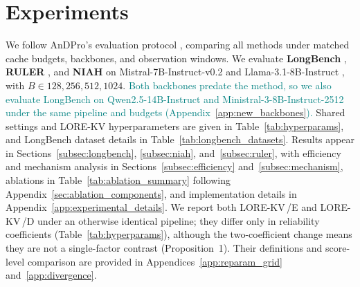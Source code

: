 \documentclass{article} %
\newcommand{\lorekvE}{LORE-KV\,/E}
\newcommand{\lorekvD}{LORE-KV\,/D}
\begin{document}
\section{Experiments} \label{subsec:setup}
We follow AnDPro’s evaluation protocol \citep{geng2026accurate}, comparing all methods under matched cache budgets, backbones, and observation windows. We evaluate \textbf{LongBench} \citep{bai2024longbench}, \textbf{RULER} \citep{hsieh2024ruler}, and \textbf{NIAH} \citep{kamradt2023needle} on Mistral-7B-Instruct-v0.2 \citep{jiang2023mistral} and Llama-3.1-8B-Instruct \citep{dubey2024llama}, with $B\in{128,256,512,1024}$. \textcolor{teal}{Both backbones predate the method, so we also evaluate LongBench on Qwen2.5-14B-Instruct and Ministral-3-8B-Instruct-2512 under the same pipeline and budgets (Appendix~\ref{app:new_backbones}).} Shared settings and LORE-KV hyperparameters are given in Table~\ref{tab:hyperparams}, and LongBench dataset details in Table~\ref{tab:longbench_datasets}. Results appear in Sections~\ref{subsec:longbench}, \ref{subsec:niah}, and~\ref{subsec:ruler}, with efficiency and mechanism analysis in Sections~\ref{subsec:efficiency} and~\ref{subsec:mechanism}, ablations in Table~\ref{tab:ablation_summary} following Appendix~\ref{sec:ablation_components}, and implementation details in Appendix~\ref{app:experimental_details}. We report both \lorekvE{} and \lorekvD{} under an otherwise identical pipeline; they differ only in reliability coefficients (Table~\ref{tab:hyperparams}), although the two-coefficient change means they are not a single-factor contrast (Proposition~1). Their definitions and score-level comparison are provided in Appendices~\ref{app:reparam_grid} and~\ref{app:divergence}.
\end{document}
